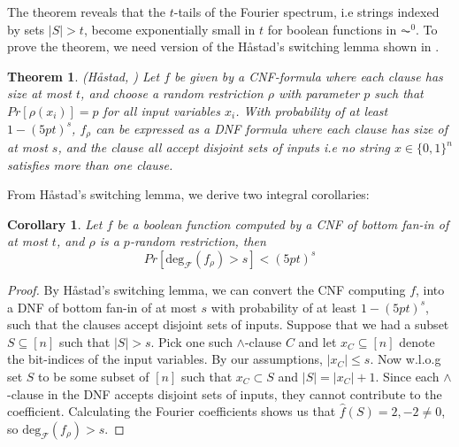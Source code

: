\documentclass{amsart}
\newtheorem{theorem}{Theorem}[section]
\newtheorem{corollary}{Corollary}[theorem]
\theoremstyle{definition}
\theoremstyle{remark}
\numberwithin{equation}{section}
\theoremstyle{remark}
\begin{document}
The theorem reveals that the $t$-tails of the Fourier spectrum, i.e strings indexed by sets $|S| > t$, become exponentially small in $t$ for boolean functions in $\AC^0$. To prove the theorem, we need version of the H\aa stad's switching lemma shown in \cite{hastad}.
%
\begin{theorem}{(\emph{H\aa stad}, \cite{hastad})}
  Let $f$ be given by a CNF-formula where each clause has size at most $t$, and choose a random restriction $\rho$ with parameter $p$ such that $Pr[\rho(x_i)] = p$ for all input variables $x_i$. With probability of at least $1 - (5pt)^s$, $f_{\rho}$ can be expressed as a DNF formula where each clause has size of at most $s$, and the clause all accept disjoint sets of inputs i.e no string $x \in \{0,1\}^n$ satisfies more than one clause.
\end{theorem}
From H\aa stad's switching lemma, we derive two integral corollaries:
%
\begin{corollary} \label{hastaddegree}
Let $f$ be a boolean function computed by a CNF of bottom fan-in of at most $t$, and $\rho$ is a $p$-random restriction, then
\begin{equation}
  Pr[\text{deg}_{\mathcal{F}}(f_\rho) > s] < (5pt)^s
\end{equation}
\end{corollary}
%
\begin{proof}
  By H\aa stad's switching lemma, we can convert the CNF computing $f$, into a DNF of bottom fan-in of at most $s$ with probability of at least $1 - (5pt)^s$, such that the clauses accept disjoint sets of inputs. Suppose that we had a subset $S \subseteq [n]$ such that $|S| > s$. Pick one such $\wedge$-clause $C$ and let $x_{C} \subseteq [n]$ denote the bit-indices of the input variables. By our assumptions, $|x_C| \leq s$. Now w.l.o.g set $S$ to be some subset of $[n]$ such that $x_C \subset S$ and $|S| = |x_C| + 1$. Since each $\wedge$-clause in the DNF accepts disjoint sets of inputs, they cannot contribute to the coefficient.  Calculating the Fourier coefficients shows us that $\hat{f}(S) = 2,-2 \neq 0$, so $\text{deg}_{\mathcal{F}}(f_\rho) > s$.
\end{proof}
\end{document}
